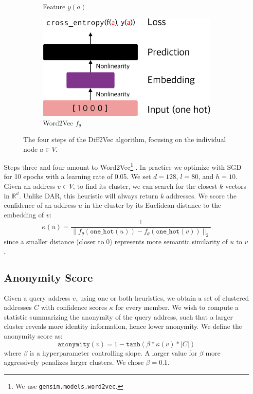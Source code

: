 \documentclass[11pt,a4paper]{article}
\begin{document}
\begin{figure}[h!]
\begin{subfigure}[b]{0.4\linewidth}
  \caption{Feature $y(a)$}
  \end{subfigure}
  \hfill
  \begin{subfigure}[b]{0.4\linewidth}
  \centering
  \includegraphics[width=\textwidth]{figures/diff2vec4}
  \caption{Word2Vec $f_\theta$}
  \end{subfigure}
\caption{The four steps of the Diff2Vec algorithm, focusing on the individual node $a \in V$.}
\label{fig:diff2vec}
\end{figure}

Steps three and four amount to Word2Vec\footnote{We use \texttt{gensim.models.word2vec}.} \citep{mikolov2013efficient,mikolov2013distributed}. In practice we optimize with SGD for 10 epochs with a learning rate of 0.05. We set $d = 128$, $l = 80$, and $h = 10$. Given an address $v \in V$, to find its cluster, we can search for the closest $k$ vectors in $\mathbb{R}^d$. Unlike DAR, this heuristic will always return $k$ addresses. We score the confidence of an address $u$ in the cluster by its Euclidean distance to the embedding of $v$:
\begin{equation*}
\kappa(u) = \frac{1}{\|f_\theta(\texttt{one\_hot}(u)) - f_\theta(\texttt{one\_hot}(v))\|_2}
\end{equation*}
since a smaller distance (closer to 0) represents more semantic similarity of $u$ to $v$.

\subsection{Anonymity Score}
\label{sec:anonymityscore}

Given a query address $v$, using one or both heuristics, we obtain a set of clustered addresses $C$ with confidence scores $\kappa$ for every member. We wish to compute a statistic summarizing the anonymity of the query address, such that a larger cluster reveals more identity information, hence lower anonymity. We define the anonymity score as:
\begin{equation}
\texttt{anonymity}(v) = 1 - \texttt{tanh}(\beta * \kappa(v) * |C|)
\label{eq:anonymity}
\end{equation}
where $\beta$ is a hyperparameter controlling slope. A larger value for $\beta$ more aggressively penalizes larger clusters. We chose $\beta = 0.1$.
\end{document}

